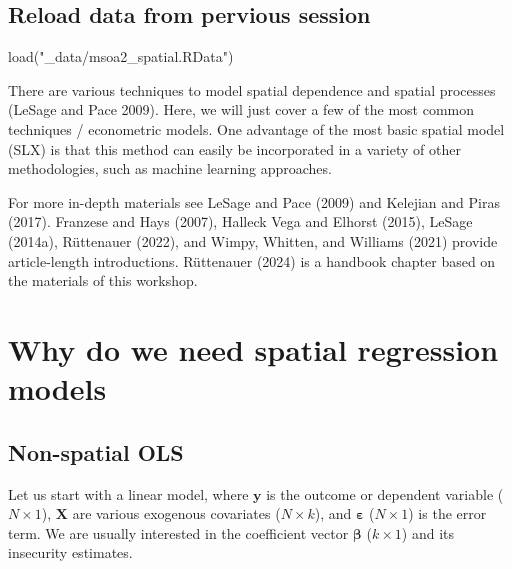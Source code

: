 \documentclass[
  letterpaper,
]{scrbook}
\newenvironment{Shaded}{\begin{snugshade}}{\end{snugshade}}
\newcommand{\FunctionTok}[1]{\textcolor[rgb]{0.28,0.35,0.67}{#1}}
\newcommand{\NormalTok}[1]{\textcolor[rgb]{0.00,0.23,0.31}{#1}}
\newcommand{\StringTok}[1]{\textcolor[rgb]{0.13,0.47,0.30}{#1}}
\begin{document}
\hypertarget{reload-data-from-pervious-session-4}{%
\subsection*{Reload data from pervious
session}\label{reload-data-from-pervious-session-4}}

\begin{Shaded}
\begin{Highlighting}[]
\FunctionTok{load}\NormalTok{(}\StringTok{"\_data/msoa2\_spatial.RData"}\NormalTok{)}
\end{Highlighting}
\end{Shaded}

There are various techniques to model spatial dependence and spatial
processes (LeSage and Pace 2009). Here, we will just cover a few of the
most common techniques / econometric models. One advantage of the most
basic spatial model (SLX) is that this method can easily be incorporated
in a variety of other methodologies, such as machine learning
approaches.

For more in-depth materials see LeSage and Pace (2009) and Kelejian and
Piras (2017). Franzese and Hays (2007), Halleck Vega and Elhorst (2015),
LeSage (2014a), Rüttenauer (2022), and Wimpy, Whitten, and Williams
(2021) provide article-length introductions. Rüttenauer (2024) is a
handbook chapter based on the materials of this workshop.

\hypertarget{why-do-we-need-spatial-regression-models}{%
\section{Why do we need spatial regression
models}\label{why-do-we-need-spatial-regression-models}}

\hypertarget{non-spatial-ols}{%
\subsection{Non-spatial OLS}\label{non-spatial-ols}}

Let us start with a linear model, where \(\boldsymbol{\mathbf{y}}\) is
the outcome or dependent variable (\(N \times 1\)),
\(\boldsymbol{\mathbf{X}}\) are various exogenous covariates
(\(N \times k\)), and \(\boldsymbol{\mathbf{\varepsilon}}\)
(\(N \times 1\)) is the error term. We are usually interested in the
coefficient vector \(\boldsymbol{\mathbf{\beta}}\) (\(k \times 1\)) and
its insecurity estimates.
\end{document}
